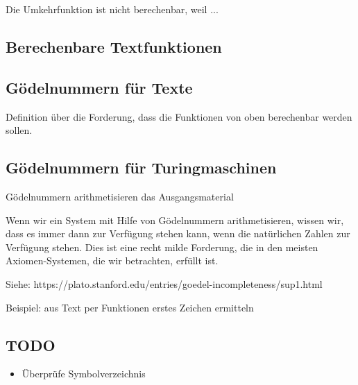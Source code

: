 \documentclass[a4paper]{amsart}
\theoremstyle{definition}
\begin{document}
Die Umkehrfunktion ist nicht berechenbar, weil ...

\subsection{Berechenbare Textfunktionen}

\subsection{Gödelnummern für Texte}

Definition über die Forderung, dass die Funktionen von oben berechenbar werden sollen.


\subsection{Gödelnummern für Turingmaschinen}








Gödelnummern arithmetisieren das Ausgangsmaterial



Wenn wir ein System mit Hilfe von Gödelnummern arithmetisieren, wissen wir, dass es immer dann zur Verfügung stehen kann, wenn die natürlichen Zahlen zur Verfügung stehen. Dies ist eine recht milde Forderung, die in den meisten Axiomen-Systemen, die wir betrachten, erfüllt ist.

Siehe: https://plato.stanford.edu/entries/goedel-incompleteness/sup1.html  


Beispiel: aus Text per Funktionen erstes Zeichen ermitteln

\begin{backup}
\section{TODO}
\begin{itemize}
     \item Überprüfe Symbolverzeichnis
\end{itemize}


\end{backup}
\end{document}
